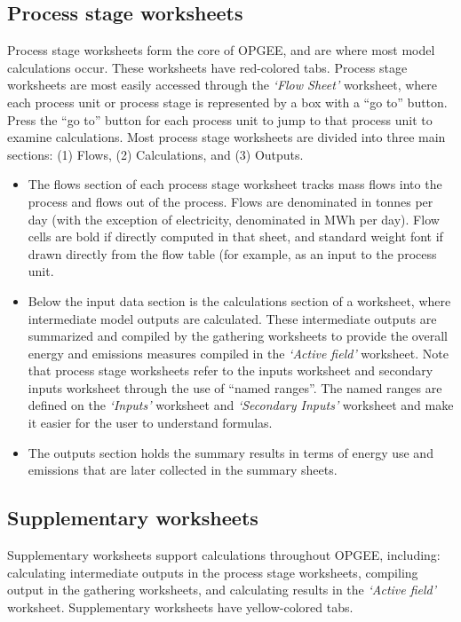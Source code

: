 \documentclass[11pt]{report}
\newcommand{\sheet}[1]{\textit{`{#1}'}}
\begin{document}
\subsection{Process stage worksheets} 

Process stage worksheets form the core of OPGEE, and are where most model calculations occur. These worksheets have red-colored tabs.
Process stage worksheets are most easily accessed through the \sheet{Flow Sheet} worksheet, where each process unit or process stage is represented by a box with a ``go to'' button. Press the ``go to'' button for each process unit to jump to that process unit to examine calculations.
Most process stage worksheets are divided into three main sections: (1) Flows, (2) Calculations, and (3) Outputs.

\begin{itemize}
\item The flows section of each process stage worksheet tracks mass flows into the process and flows out of the process. Flows are denominated in tonnes per day (with the exception of electricity, denominated in MWh per day). 
Flow cells are bold if directly computed in that sheet, and standard weight font if drawn directly from the flow table (for example, as an input to the process unit.
\item Below the input data section is the calculations section of a worksheet, where intermediate model outputs are calculated. These intermediate outputs are summarized and compiled by the gathering worksheets to provide the overall energy and emissions measures compiled in the \sheet{Active field} worksheet.
Note that process stage worksheets refer to the inputs worksheet and secondary inputs worksheet through the use of ``named ranges''. The named ranges are defined on the \sheet{Inputs} worksheet and \sheet{Secondary Inputs} worksheet and make it easier for the user to understand formulas.
\item The outputs section holds the summary results in terms of energy use and emissions that are later collected in the summary sheets.
\end{itemize}

\subsection{Supplementary worksheets} 

Supplementary worksheets support calculations throughout OPGEE, including: calculating intermediate outputs in the process stage worksheets, compiling output in the gathering worksheets, and calculating results in the \sheet{Active field} worksheet. Supplementary worksheets have yellow-colored tabs.
\end{document}
